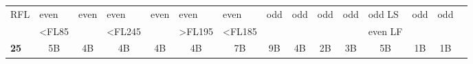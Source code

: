 \documentclass[10pt,landscape,a4paper]{article}
\begin{document}
\begin{textblock}{30}
\begin{table}[]
\begin{tabular}{lcccccccccccccc}
\multicolumn{1}{|l|}{RFL}         & \multicolumn{1}{l|}{even}                                                              & \multicolumn{1}{l|}{even}  & \multicolumn{1}{l|}{even}                                                             & \multicolumn{1}{l|}{even}                                                              & \multicolumn{1}{l|}{even}                                           & \multicolumn{1}{l|}{even}                                                   & \multicolumn{1}{l||}{odd}                                                                    & \multicolumn{1}{l|}{odd}   & \multicolumn{1}{l|}{odd}   & \multicolumn{1}{l|}{odd}                                                                                  & \multicolumn{1}{l|}{odd LS}                                                                        & \multicolumn{1}{l|}{odd}                                                      & \multicolumn{1}{l|}{odd}       & \multicolumn{1}{c|}{}                                                \\ \cline{1-14}
\multicolumn{1}{|l|}{}            & \multicolumn{1}{r|}{\scriptsize \textless{}FL85}                        & \multicolumn{1}{r|}{}      & \multicolumn{1}{r|}{\scriptsize \textless{}FL245}                      & \multicolumn{1}{r|}{}                                                                  & \multicolumn{1}{r|}{\scriptsize \textgreater{}FL195} & \multicolumn{1}{r|}{\scriptsize \textless{}FL185}            & \multicolumn{1}{r||}{}                                                                       & \multicolumn{1}{r|}{}      & \multicolumn{1}{r|}{}      & \multicolumn{1}{r|}{}                                                                                     & \multicolumn{1}{r|}{\scriptsize even LF}                                            & \multicolumn{1}{r|}{}                                                         & \multicolumn{1}{r|}{}          & \multicolumn{1}{c|}{}                                                \\ \cline{1-14}
\multicolumn{1}{|l|}{\textbf{25}} & \multicolumn{1}{c|}{5B}                                                                & \multicolumn{1}{c|}{4B}    & \multicolumn{1}{c|}{4B}                                                               & \multicolumn{1}{c|}{4B}                                                                & \multicolumn{1}{c|}{4B}                                             & \multicolumn{1}{c|}{7B}                                                     & \multicolumn{1}{c||}{9B}                                                                     & \multicolumn{1}{c|}{4B}    & \multicolumn{1}{c|}{2B}    & \multicolumn{1}{c|}{3B}                                                                                   & \multicolumn{1}{c|}{5B}                                                                            & \multicolumn{1}{c|}{1B}                                                       & \multicolumn{1}{c|}{1B}        & \multicolumn{1}{c|}{}                                                \\ \cline{1-14}

\end{tabular}
\end{table}
\end{textblock}
\end{document}
